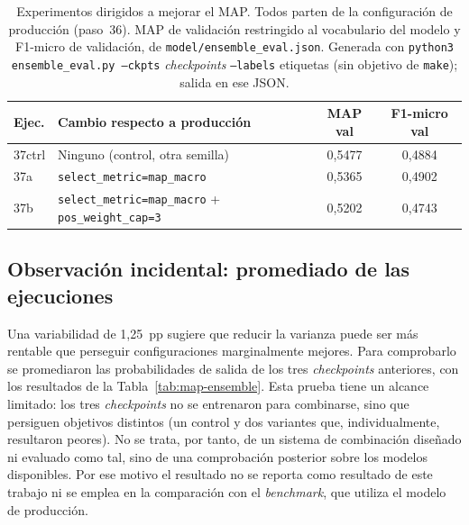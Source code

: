 \begin{table}[h]
\centering
\caption{Experimentos dirigidos a mejorar el MAP. Todos parten de la configuración de producción (paso~36). MAP de validación restringido al vocabulario del modelo y F1-micro de validación, de \texttt{model/\allowbreak ensemble\_eval.json}. Generada con \texttt{python3 ensemble\_eval.py --ckpts} \emph{checkpoints} \texttt{--labels} etiquetas (sin objetivo de \texttt{make}); salida en ese JSON.}
\label{tab:map-experiments}
\begin{tabular}{lP{6.0cm}cc}
\hline
\textbf{Ejec.} & \textbf{Cambio respecto a producción} & \textbf{MAP val} & \textbf{F1-micro val} \\
\hline
37ctrl & Ninguno (control, otra semilla) & 0{,}5477 & 0{,}4884 \\
37a & \texttt{select\_metric=map\_macro} & 0{,}5365 & 0{,}4902 \\
37b & \texttt{select\_metric=map\_macro} + \texttt{pos\_weight\_cap=3} & 0{,}5202 & 0{,}4743 \\
\hline
\end{tabular}
\end{table}

\subsection{Observación incidental: promediado de las ejecuciones}

Una variabilidad de 1{,}25~pp sugiere que reducir la varianza puede ser más rentable que perseguir configuraciones marginalmente mejores. Para comprobarlo se promediaron las probabilidades de salida de los tres \emph{checkpoints} anteriores, con los resultados de la Tabla~\ref{tab:map-ensemble}. Esta prueba tiene un alcance limitado: los tres \emph{checkpoints} no se entrenaron para combinarse, sino que persiguen objetivos distintos (un control y dos variantes que, individualmente, resultaron peores). No se trata, por tanto, de un sistema de combinación diseñado ni evaluado como tal, sino de una comprobación posterior sobre los modelos disponibles. Por ese motivo el resultado no se reporta como resultado de este trabajo ni se emplea en la comparación con el \emph{benchmark}, que utiliza el modelo de producción.

